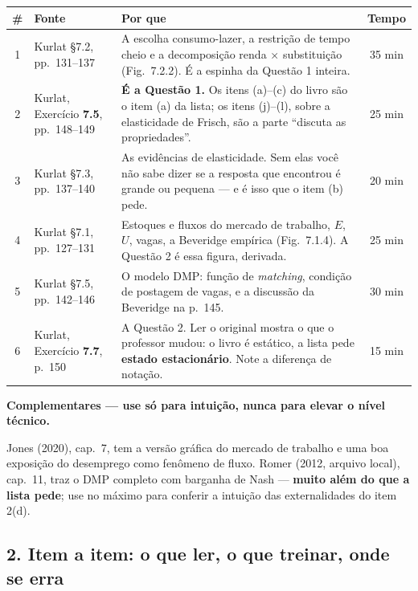 \documentclass[11pt, a4paper]{article}
\newcommand{\passo}[1]{\medskip\noindent\textbf{#1}\par\nobreak}
\begin{document}
\begin{center}
\small
\begin{tabular}{clp{7.4cm}c}
\toprule
\textbf{\#} & \textbf{Fonte} & \textbf{Por que} & \textbf{Tempo} \\
\midrule
1 & Kurlat §7.2, pp.\ 131--137
  & A escolha consumo-lazer, a restrição de tempo cheio e a decomposição renda
    $\times$ substituição (Fig.\ 7.2.2). É a espinha da Questão 1 inteira. & 35 min \\
2 & Kurlat, Exercício \textbf{7.5}, pp.\ 148--149
  & \textbf{É a Questão 1.} Os itens (a)--(c) do livro são o item (a) da lista; os itens
    (j)--(l), sobre a elasticidade de Frisch, são a parte ``discuta as propriedades''. & 25 min \\
3 & Kurlat §7.3, pp.\ 137--140
  & As evidências de elasticidade. Sem elas você não sabe dizer se a resposta que
    encontrou é grande ou pequena --- e é isso que o item (b) pede. & 20 min \\
4 & Kurlat §7.1, pp.\ 127--131
  & Estoques e fluxos do mercado de trabalho, $E$, $U$, vagas, a Beveridge empírica
    (Fig.\ 7.1.4). A Questão 2 é essa figura, derivada. & 25 min \\
5 & Kurlat §7.5, pp.\ 142--146
  & O modelo DMP: função de \emph{matching}, condição de postagem de vagas, e a
    discussão da Beveridge na p.\ 145. & 30 min \\
6 & Kurlat, Exercício \textbf{7.7}, p.\ 150
  & A Questão 2. Ler o original mostra o que o professor mudou: o livro é estático, a
    lista pede \textbf{estado estacionário}. Note a diferença de notação. & 15 min \\
\bottomrule
\end{tabular}
\end{center}

\passo{Complementares --- use só para intuição, nunca para elevar o nível técnico.}
Jones (2020), cap.\ 7, tem a versão gráfica do mercado de trabalho e uma boa exposição do
desemprego como fenômeno de fluxo. Romer (2012, arquivo local), cap.\ 11, traz o DMP
completo com barganha de Nash --- \textbf{muito além do que a lista pede}; use no máximo
para conferir a intuição das externalidades do item 2(d).

\subsection*{2. Item a item: o que ler, o que treinar, onde se erra}
\end{document}
